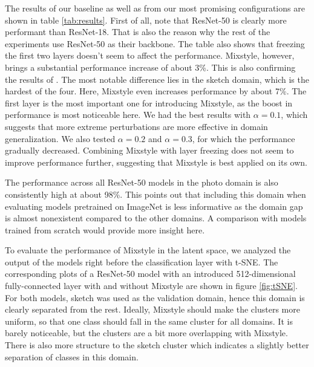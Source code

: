 The results of our baseline as well as from our most promising configurations are shown in table \ref{tab:results}. First of all, note that ResNet-50 is clearly more performant than ResNet-18. That is also the reason why the rest of the experiments use ResNet-50 as their backbone. The table also shows that freezing the first two layers doesn't seem to affect the performance. Mixstyle, however, brings a substantial performance increase of about 3\%. This is also confirming the results of \cite{mixstyle_ref}. The most notable difference lies in the sketch domain, which is the hardest of the four. Here, Mixstyle even increases performance by about 7\%. The first layer is the most important one for introducing Mixstyle, as the boost in performance is most noticeable here. We had the best results with $\alpha = 0.1$, which suggests that more extreme perturbations are more effective in domain generalization. We also tested $\alpha = 0.2$ and $\alpha = 0.3$, for which the performance gradually decreased. Combining Mixstyle with layer freezing does not seem to improve performance further, suggesting that Mixstyle is best applied on its own.

The performance across all ResNet-50 models in the photo domain is also consistently high at about 98\%. This points out that including this domain when evaluating models pretrained on ImageNet is less informative as the domain gap is almost nonexistent compared to the other domains. A comparison with models trained from scratch would provide more insight here.

To evaluate the performance of Mixstyle in the latent space, we analyzed the output of the models right before the classification layer with t-SNE. The corresponding plots of a ResNet-50 model with an introduced 512-dimensional fully-connected layer with and without Mixstyle are shown in figure \ref{fig:tSNE}. For both models, sketch was used as the validation domain, hence this domain is clearly separated from the rest. Ideally, Mixstyle should make the clusters more uniform, so that one class should fall in the same cluster for all domains. It is barely noticeable, but the clusters are a bit more overlapping with Mixstyle. There is also more structure to the sketch cluster which indicates a slightly better separation of classes in this domain.

